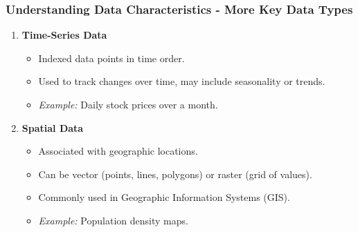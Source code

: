 \documentclass[aspectratio=169]{beamer}
\begin{document}
\begin{frame}[fragile]
    \frametitle{Understanding Data Characteristics - More Key Data Types}
    \begin{enumerate}[resume]
        \item \textbf{Time-Series Data}
            \begin{itemize}
                \item Indexed data points in time order.
                \item Used to track changes over time, may include seasonality or trends.
                \item \textit{Example:} Daily stock prices over a month.
            \end{itemize}

        \item \textbf{Spatial Data}
            \begin{itemize}
                \item Associated with geographic locations.
                \item Can be vector (points, lines, polygons) or raster (grid of values).
                \item Commonly used in Geographic Information Systems (GIS).
                \item \textit{Example:} Population density maps.
            \end{itemize}
    \end{enumerate}
\end{frame}
\end{document}
